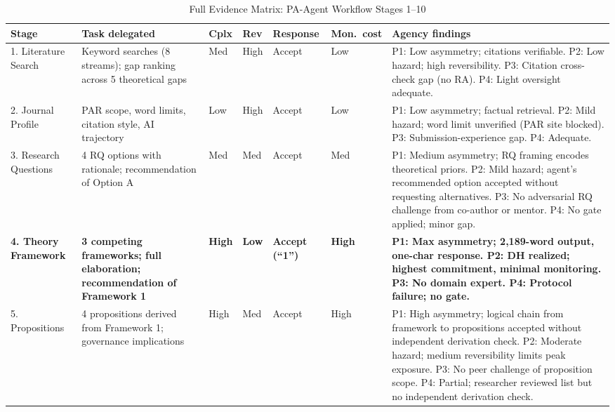 \documentclass[12pt]{article}
\begin{document}
\newpage
\begin{table}[p]
\centering
\caption{Full Evidence Matrix: PA-Agent Workflow Stages 1--10}
\label{tab:fullmatrix}
\begin{threeparttable}
\scriptsize
\renewcommand{\arraystretch}{1.2}
\begin{tabularx}{\textwidth}{@{}p{1.4cm}p{2.4cm}p{1.1cm}p{1cm}p{1.4cm}p{1.3cm}X@{}}
\toprule
\textbf{Stage} & \textbf{Task delegated} & \textbf{Cplx} & \textbf{Rev} & \textbf{Response} & \textbf{Mon.\ cost} & \textbf{Agency findings} \\
\midrule
1. Literature Search &
Keyword searches (8 streams); gap ranking across 5 theoretical gaps &
Med & High & Accept & Low &
P1: Low asymmetry; citations verifiable. P2: Low hazard; high reversibility. P3: Citation cross-check gap (no RA). P4: Light oversight adequate. \\

2. Journal Profile &
PAR scope, word limits, citation style, AI trajectory &
Low & High & Accept & Low &
P1: Low asymmetry; factual retrieval. P2: Mild hazard; word limit unverified (PAR site blocked). P3: Submission-experience gap. P4: Adequate. \\

3. Research Questions &
4 RQ options with rationale; recommendation of Option A &
Med & Med & Accept & Med &
P1: Medium asymmetry; RQ framing encodes theoretical priors. P2: Mild hazard; agent's recommended option accepted without requesting alternatives. P3: No adversarial RQ challenge from co-author or mentor. P4: No gate applied; minor gap. \\

\textbf{4. Theory Framework} &
\textbf{3 competing frameworks; full elaboration; recommendation of Framework 1} &
\textbf{High} & \textbf{Low} & \textbf{Accept (``1'')} & \textbf{High} &
\textbf{P1: Max asymmetry; 2,189-word output, one-char response. P2: DH realized; highest commitment, minimal monitoring. P3: No domain expert. P4: Protocol failure; no gate.} \\

5. Propositions &
4 propositions derived from Framework 1; governance implications &
High & Med & Accept & High &
P1: High asymmetry; logical chain from framework to propositions accepted without independent derivation check. P2: Moderate hazard; medium reversibility limits peak exposure. P3: No peer challenge of proposition scope. P4: Partial; researcher reviewed list but no independent derivation check. \\


\end{tabularx}
\end{threeparttable}
\end{table}
\end{document}

